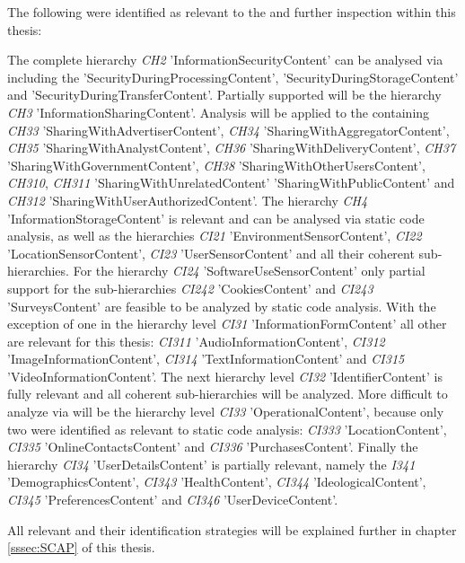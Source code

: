 The following \ipp were identified as relevant to the \sca and further inspection within this thesis:

The complete hierarchy \textit{CH2} 'InformationSecurityContent' can be analysed via \sca including the \ipp 'SecurityDuringProcessingContent', 'SecurityDuringStorageContent' and 'SecurityDuringTransferContent'.
Partially supported will be the hierarchy \textit{CH3} 'InformationSharingContent'. Analysis will be applied to the containing \ipp \textit{CH33} 'SharingWithAdvertiserContent', \textit{CH34} 'SharingWithAggregatorContent', \textit{CH35} 'SharingWithAnalystContent', \textit{CH36} 'SharingWithDeliveryContent', \textit{CH37} 'SharingWithGovernmentContent', \textit{CH38} 'SharingWithOtherUsersContent', \textit{CH310}, \textit{CH311} 'SharingWithUnrelatedContent' 'SharingWithPublicContent' and \textit{CH312} 'SharingWithUserAuthorizedContent'.
The hierarchy \textit{CH4} 'InformationStorageContent' is relevant and can be analysed via static code analysis, as well as the hierarchies \textit{CI21} 'EnvironmentSensorContent', \textit{CI22} 'LocationSensorContent', \textit{CI23} 'UserSensorContent' and all their coherent sub-hierarchies.
For the hierarchy \textit{CI24} 'SoftwareUseSensorContent' only partial support for the sub-hierarchies \textit{CI242} 'CookiesContent' and \textit{CI243} 'SurveysContent' are feasible to be analyzed by static code analysis.
With the exception of one \ipp in the hierarchy level \textit{CI31} 'InformationFormContent' all other \ipp are relevant for this thesis: \textit{CI311} 'AudioInformationContent', \textit{CI312} 'ImageInformationContent', \textit{CI314} 'TextInformationContent' and \textit{CI315} 'VideoInformationContent'.
The next hierarchy level \textit{CI32} 'IdentifierContent' is fully relevant and all coherent sub-hierarchies will be analyzed.
More difficult to analyze via \sca will be the hierarchy level \textit{CI33} 'OperationalContent', because only two \ipp were identified as relevant to static code analysis: \textit{CI333} 'LocationContent', \textit{CI335} 'OnlineContactsContent' and \textit{CI336} 'PurchasesContent'.
Finally the hierarchy \textit{CI34} 'UserDetailsContent' is partially relevant, namely the \ipp \textit{I341} 'DemographicsContent', \textit{CI343} 'HealthContent', \textit{CI344} 'IdeologicalContent', \textit{CI345} 'PreferencesContent' and \textit{CI346} 'UserDeviceContent'.

All relevant \ipp and their \sca identification strategies will be explained further in chapter \ref{sssec:SCAP} of this thesis.
